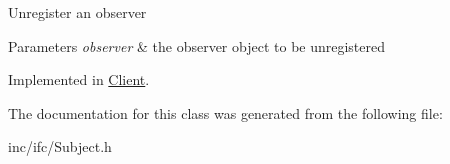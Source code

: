 Unregister an observer 
\begin{DoxyParams}{Parameters}
{\em observer} & the observer object to be unregistered \\
\hline
\end{DoxyParams}


Implemented in \hyperlink{classClient_abfce703b679961b961ff24bbfc532ce4}{Client}.



The documentation for this class was generated from the following file\+:\begin{DoxyCompactItemize}
\item 
inc/ifc/Subject.\+h\end{DoxyCompactItemize}
